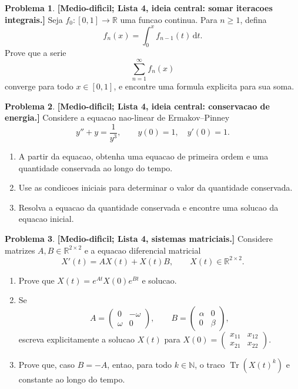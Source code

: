 \documentclass[10pt,a4paper]{amsart}
\newcommand{\R}{\mathbb{R}}
\renewcommand{\d}{\mathrm{d}}
\theoremstyle{definition}
\newtheorem{problema}{Problema}
\begin{document}
\begin{problema}
\textbf{[Medio-dificil; Lista 4, ideia central: somar iteracoes integrais.]}
Seja $f_0:[0,1]\to\R$ uma funcao continua. Para $n\ge 1$, defina
\[
    f_n(x)=\int_0^x f_{n-1}(t)\,\d t.
\]
Prove que a serie
\[
    \sum_{n=1}^{\infty} f_n(x)
\]
converge para todo $x\in[0,1]$, e encontre uma formula explicita para sua
soma.
\end{problema}

\begin{problema}
\textbf{[Medio-dificil; Lista 4, ideia central: conservacao de energia.]}
Considere a equacao nao-linear de Ermakov--Pinney
\[
    y''+y=\frac{1}{y^3},
    \qquad y(0)=1,\quad y'(0)=1.
\]
\begin{enumerate}[label=(\alph*)]
    \item A partir da equacao, obtenha uma equacao de primeira ordem e uma
    quantidade conservada ao longo do tempo.
    \item Use as condicoes iniciais para determinar o valor da quantidade
    conservada.
    \item Resolva a equacao da quantidade conservada e encontre uma solucao
    da equacao inicial.
\end{enumerate}
\end{problema}

\begin{problema}
\textbf{[Medio-dificil; Lista 4, sistemas matriciais.]}
Considere matrizes $A,B\in\R^{2\times2}$ e a equacao diferencial matricial
\[
    X'(t)=AX(t)+X(t)B,\qquad X(t)\in\R^{2\times2}.
\]
\begin{enumerate}[label=(\alph*)]
    \item Prove que $X(t)=e^{At}X(0)e^{Bt}$ e solucao.
    \item Se
    \[
        A=\begin{pmatrix}0&-\omega\\ \omega&0\end{pmatrix},
        \qquad
        B=\begin{pmatrix}\alpha&0\\0&\beta\end{pmatrix},
    \]
    escreva explicitamente a solucao $X(t)$ para
    $X(0)=\begin{pmatrix}x_{11}&x_{12}\\x_{21}&x_{22}\end{pmatrix}$.
    \item Prove que, caso $B=-A$, entao, para todo $k\in\mathbb{N}$, o traco
    $\operatorname{Tr}(X(t)^k)$ e constante ao longo do tempo.
\end{enumerate}
\end{problema}
\end{document}
